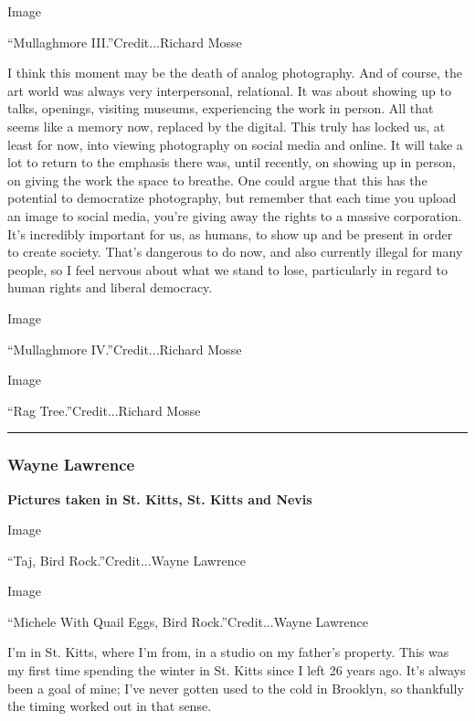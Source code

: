 Image

``Mullaghmore III.''Credit...Richard Mosse

I think this moment may be the death of analog photography. And of
course, the art world was always very interpersonal, relational. It was
about showing up to talks, openings, visiting museums, experiencing the
work in person. All that seems like a memory now, replaced by the
digital. This truly has locked us, at least for now, into viewing
photography on social media and online. It will take a lot to return to
the emphasis there was, until recently, on showing up in person, on
giving the work the space to breathe. One could argue that this has the
potential to democratize photography, but remember that each time you
upload an image to social media, you're giving away the rights to a
massive corporation. It's incredibly important for us, as humans, to
show up and be present in order to create society. That's dangerous to
do now, and also currently illegal for many people, so I feel nervous
about what we stand to lose, particularly in regard to human rights and
liberal democracy.

Image

``Mullaghmore IV.''Credit...Richard Mosse

Image

``Rag Tree.''Credit...Richard Mosse

\begin{center}\rule{0.5\linewidth}{\linethickness}\end{center}

\hypertarget{wayne-lawrence}{%
\subsubsection{\texorpdfstring{\textbf{Wayne
Lawrence}}{Wayne Lawrence}}\label{wayne-lawrence}}

\textbf{Pictures taken in St. Kitts, St. Kitts and Nevis}

Image

``Taj, Bird Rock.''Credit...Wayne Lawrence

Image

``Michele With Quail Eggs, Bird Rock.''Credit...Wayne Lawrence

I'm in St. Kitts, where I'm from, in a studio on my father's property.
This was my first time spending the winter in St. Kitts since I left 26
years ago. It's always been a goal of mine; I've never gotten used to
the cold in Brooklyn, so thankfully the timing worked out in that sense.

